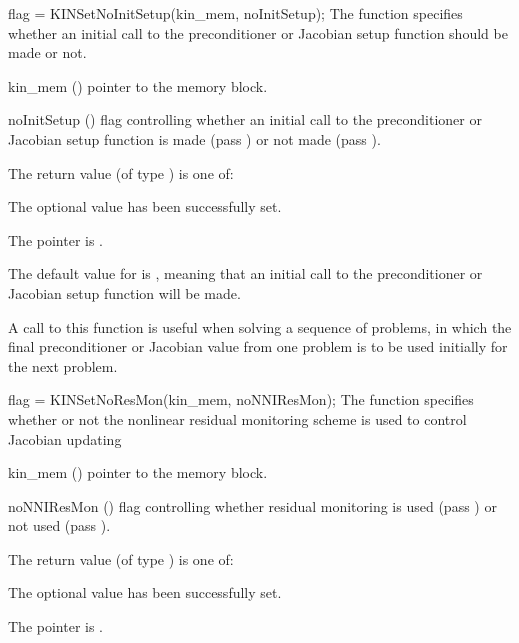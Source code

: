 {
flag = KINSetNoInitSetup(kin\_mem, noInitSetup);
}
{
  The function  specifies whether an initial call
  to the preconditioner or Jacobian setup function should be made or not.
}
{
  \begin{args}[noInitSeti[]
  \item[kin\_mem] ()
    pointer to the {\kinsol} memory block.
  \item[noInitSetup] ()
    flag controlling whether an initial call to the preconditioner or Jacobian
    setup function is made (pass ) or not made (pass ).
  \end{args}
}
{
  The return value  (of type ) is one of:
  \begin{args}
  \item[\Id{KIN\_SUCCESS}]
    The optional value has been successfully set.
  \item[\Id{KIN\_MEM\_NULL}]
    The  pointer is .
  \end{args}
}
{
  The default value for  is , meaning that an initial call
  to the preconditioner or Jacobian setup function will be made.

  A call to this function is useful when solving a sequence of problems, in which
  the final preconditioner or Jacobian value from one problem is to be used initially
  for the next problem.
}
{
flag = KINSetNoResMon(kin\_mem, noNNIResMon);
}
{
  The function  specifies whether or not the nonlinear
  residual monitoring scheme is used to control Jacobian updating
}
{
  \begin{args}[noNNIResMon]
  \item[kin\_mem] ()
    pointer to the {\kinsol} memory block.
  \item[noNNIResMon] ()
    flag controlling whether residual monitoring is used (pass )
    or not used (pass ).

  \end{args}
}
{
  The return value  (of type ) is one of:
  \begin{args}
  \item[\Id{KIN\_SUCCESS}]
    The optional value has been successfully set.
  \item[\Id{KIN\_MEM\_NULL}]
    The  pointer is .
  \end{args}
}
